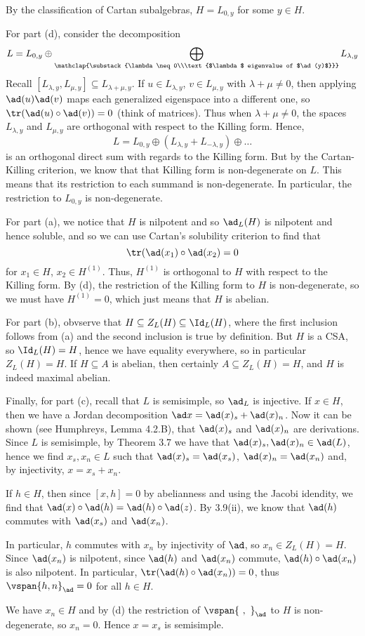 By the classification of Cartan subalgebras, $H = L_{0, y}$ for some
$y \in H$.

For part (d), consider the decomposition
\[ L = L_{0, y} \oplus \bigoplus_{\mathclap{\substack{\lambda\neq 0\\\text{$\lambda$ eigenvalue of $\ad(y)$}}}} L_{\lambda, y} \]
Recall $[L_{\lambda, y}, L_{\mu, y}] \subseteq L_{\lambda+\mu, y}$.
If $u \in L_{\lambda, y}$, $v \in L_{\mu, y}$ with $\lambda + \mu \neq 0$, then
applying $\ad(u)\ad(v)$ maps each generalized eigenspace into a different one, so
$\tr(\ad(u) \circ \ad(v)) = 0$ (think of matrices). Thus when
$\lambda + \mu \neq 0$, the spaces $L_{\lambda, y}$ and $L_{\mu, y}$ are
orthogonal with respect to the Killing form. Hence,
\[ L = L_{0, y} \oplus (L_{\lambda, y} + L_{-\lambda, y}) \oplus \ldots \]
is an orthogonal direct sum with regards to the Killing form. But by
the Cartan-Killing criterion, we know that that Killing form is non-degenerate
on $L$. This means that its restriction to each summand is non-degenerate. In
particular, the restriction to $L_{0, y}$ is non-degenerate.

For part (a), we notice that $H$ is nilpotent and so $\ad_L(H)$ is nilpotent
and hence soluble, and so we can use Cartan's solubility criterion to find that
\[ \tr(\ad(x_1) \circ \ad(x_2) = 0 \]
for $x_1 \in H$, $x_2 \in H^{(1)}$. Thus, $H^{(1)}$ is orthogonal to $H$ with respect
to the Killing form. By (d), the restriction of the Killing form to $H$ is
non-degenerate, so we must have $H^{(1)} = 0$, which just means that $H$ is
abelian.

For part (b), obvserve that $H \subseteq Z_L(H) \subseteq \Id_L(H)$, where the first
inclusion follows from (a) and the second inclusion is true by definition.
But $H$ is a CSA, so $\Id_L(H) = H$, hence we have equality everywhere, so in
particular $Z_L(H) = H$. If $H \subseteq A$ is abelian, then certainly $A \subseteq Z_L(H) = H$,
and $H$ is indeed maximal abelian.

Finally, for part (c), recall that $L$ is semisimple, so
$\ad_L$ is injective. If $x \in H$, then we have a Jordan decomposition
$\ad x = \ad(x)_s + \ad(x)_n$. Now it can be shown (see Humphreys, Lemma 4.2.B),
that $\ad(x)_s$ and $\ad(x)_n$ are derivations. Since $L$ is semisimple, by
Theorem 3.7 we have that $\ad(x)_s, \ad(x)_n \in \ad(L)$, hence we find
$x_s, x_n \in L$ such that $\ad(x)_s = \ad(x_s)$, $\ad(x)_n = \ad(x_n)$ and,
by injectivity, $x = x_s + x_n$.

If $h \in H$, then since $[x, h] = 0$ by abelianness and using the Jacobi
idendity, we find that $\ad(x) \circ \ad(h) = \ad(h) \circ \ad(z)$. By
3.9(ii), we know that $\ad(h)$ commutes with $\ad(x_s)$ and $\ad(x_n)$.

In particular, $h$ commutes with $x_n$ by injectivity of $\ad$, so
$x_n \in Z_L(H) = H$. Since $\ad(x_n)$ is nilpotent, since $\ad(h)$ and $\ad(x_n)$
commute, $\ad(h) \circ\ad(x_n)$ is also nilpotent. In particular,
$\tr(\ad(h) \circ \ad(x_n)) = 0$, thus $\vspan{h, n}_{\ad} = 0$ for all $h \in H$.

We have $x_n \in H$ and by (d) the restriction of $\vspan{\ ,\ }_{\ad}$ to $H$
is non-degenerate, so $x_n = 0$. Hence $x = x_s$ is semisimple.
